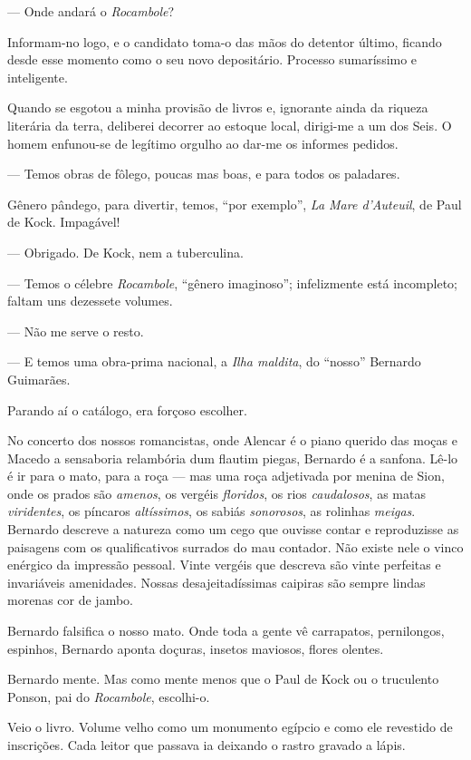 --- Onde andará o \emph{Rocambole}?

Informam-no logo, e o candidato toma-o das mãos do detentor último,
ficando desde esse momento como o seu novo depositário. Processo
sumaríssimo e inteligente.

Quando se esgotou a minha provisão de livros e, ignorante ainda da
riqueza literária da terra, deliberei decorrer ao estoque local,
dirigi-me a um dos Seis. O homem enfunou-se de legítimo orgulho ao
dar-me os informes pedidos.

--- Temos obras de fôlego, poucas mas boas, e para todos os paladares.

Gênero pândego, para divertir, temos, ``por exemplo'', \emph{La Mare
d'Auteuil}, de Paul de Kock. Impagável!

--- Obrigado. De Kock, nem a tuberculina.

--- Temos o célebre \emph{Rocambole}, ``gênero imaginoso''; infelizmente
está incompleto; faltam uns dezessete volumes.

--- Não me serve o resto.

--- E temos uma obra-prima nacional, a \emph{Ilha maldita}, do ``nosso''
Bernardo Guimarães.

Parando aí o catálogo, era forçoso escolher.

No concerto dos nossos romancistas, onde Alencar é o piano querido das
moças e Macedo a sensaboria relambória dum flautim piegas, Bernardo é a
sanfona. Lê-lo é ir para o mato, para a roça --- mas uma roça adjetivada
por menina de Sion, onde os prados são \emph{amenos}, os vergéis
\emph{floridos}, os rios \emph{caudalosos}, as matas \emph{viridentes},
os píncaros \emph{altíssimos}, os sabiás \emph{sonorosos}, as rolinhas
\emph{meigas}. Bernardo descreve a natureza como um cego que ouvisse
contar e reproduzisse as paisagens com os qualificativos surrados do mau
contador. Não existe nele o vinco enérgico da impressão pessoal. Vinte
vergéis que descreva são vinte perfeitas e invariáveis amenidades.
Nossas desajeitadíssimas caipiras são sempre lindas morenas cor de
jambo.

Bernardo falsifica o nosso mato. Onde toda a gente vê carrapatos,
pernilongos, espinhos, Bernardo aponta doçuras, insetos maviosos, flores
olentes.

Bernardo mente. Mas como mente menos que o Paul de Kock ou o truculento
Ponson, pai do \emph{Rocambole}, escolhi-o.

Veio o livro. Volume velho como um monumento egípcio e como ele
revestido de inscrições. Cada leitor que passava ia deixando o rastro
gravado a lápis.


